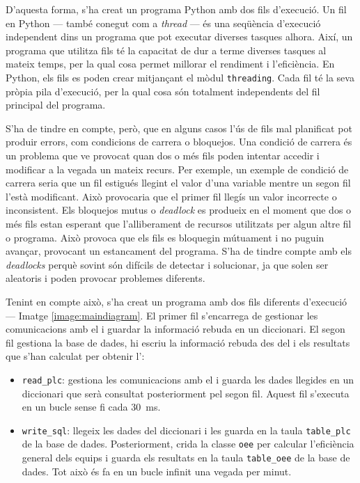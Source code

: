 \documentclass{tfgitic}[2022/06/30]
\begin{document}
D'aquesta forma, s'ha creat un programa Python amb dos fils d'execució. Un fil en Python --- també conegut com a \emph{thread} --- és una seqüència d'execució independent dins un programa que pot executar diverses tasques alhora. Així, un programa que utilitza fils té la capacitat de dur a terme diverses tasques al mateix temps, per la qual cosa permet millorar el rendiment i l'eficiència. En Python, els fils es poden crear mitjançant el mòdul \texttt{threading}. Cada fil té la seva pròpia pila d'execució, per la qual cosa són totalment independents del fil principal del programa.


S'ha de tindre en compte, però, que en alguns casos l'ús de fils mal planificat pot produir errors, com condicions de carrera o bloquejos. Una condició de carrera és un problema que ve provocat quan dos o més fils poden intentar accedir i modificar a la vegada un mateix recurs. Per exemple, un exemple de condició de carrera seria que un fil estigués llegint el valor d'una variable mentre un segon fil l'està modificant. Això provocaria que el primer fil llegís un valor incorrecte o inconsistent. Els bloquejos mutus o \emph{deadlock} es produeix en el moment que dos o més fils estan esperant que l'alliberament de recursos utilitzats per algun altre fil o programa. Això provoca que els fils es bloquegin mútuament i no puguin avançar, provocant un estancament del programa. S'ha de tindre compte amb els \emph{deadlocks} perquè sovint són difícils de detectar i solucionar, ja que solen ser aleatoris i poden provocar problemes diferents.

Tenint en compte això, s'ha creat un programa amb dos fils diferents d'execució --- Imatge \ref{image:maindiagram}. El primer fil s'encarrega de gestionar les comunicacions amb el  i guardar la informació rebuda en un diccionari. El segon fil gestiona la base de dades, hi escriu la informació rebuda des del  i els resultats que s'han calculat per obtenir l':

\begin{itemize}
    \item \texttt{read\_plc}: gestiona les comunicacions amb el  i guarda les dades llegides en un diccionari que serà consultat posteriorment pel segon fil. Aquest fil s'executa en un bucle sense fi cada \SI{30}{ms}.
    \item \texttt{write\_sql}: llegeix les dades del diccionari i les guarda en la taula \texttt{table\_plc} de la base de dades. Posteriorment, crida la classe \texttt{oee} per calcular l'eficiència general dels equips i guarda els resultats en la taula \texttt{table\_oee} de la base de dades. Tot això és fa en un bucle infinit una vegada per minut.
\end{itemize}
\end{document}
